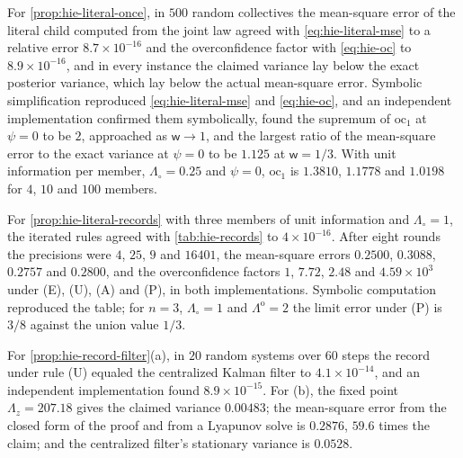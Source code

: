 \begin{numcheck}\label{chk:hie-literal}
For \cref{prop:hie-literal-once}, in $500$ random collectives the mean-square error of the literal child computed from the joint law agreed with \eqref{eq:hie-literal-mse} to a relative error $8.7\times10^{-16}$ and the overconfidence factor with \eqref{eq:hie-oc} to $8.9\times10^{-16}$, and in every instance the claimed variance lay below the exact posterior variance, which lay below the actual mean-square error. Symbolic simplification reproduced \eqref{eq:hie-literal-mse} and \eqref{eq:hie-oc}, and an independent implementation confirmed them symbolically, found the supremum of $\mathrm{oc}_1$ at $\psi=0$ to be $2$, approached as $\mathsf w\to1$, and the largest ratio of the mean-square error to the exact variance at $\psi=0$ to be $1.125$ at $\mathsf w=1/3$. With unit information per member, $\Lambda_\circ=0.25$ and $\psi=0$, $\mathrm{oc}_1$ is $1.3810$, $1.1778$ and $1.0198$ for $4$, $10$ and $100$ members.

For \cref{prop:hie-literal-records} with three members of unit information and $\Lambda_\circ=1$, the iterated rules agreed with \cref{tab:hie-records} to $4\times10^{-16}$. After eight rounds the precisions were $4$, $25$, $9$ and $16401$, the mean-square errors $0.2500$, $0.3088$, $0.2757$ and $0.2800$, and the overconfidence factors $1$, $7.72$, $2.48$ and $4.59\times10^3$ under (E), (U), (A) and (P), in both implementations. Symbolic computation reproduced the table; for $n=3$, $\Lambda_\circ=1$ and $\Lambda^{\mathrm o}=2$ the limit error under (P) is $3/8$ against the union value $1/3$.

For \cref{prop:hie-record-filter}(a), in $20$ random systems over $60$ steps the record under rule (U) equaled the centralized Kalman filter to $4.1\times10^{-14}$, and an independent implementation found $8.9\times10^{-15}$. For (b), the fixed point $\Lambda_z=207.18$ gives the claimed variance $0.00483$; the mean-square error from the closed form of the proof and from a Lyapunov solve is $0.2876$, $59.6$ times the claim; and the centralized filter's stationary variance is $0.0528$.


\end{numcheck}
